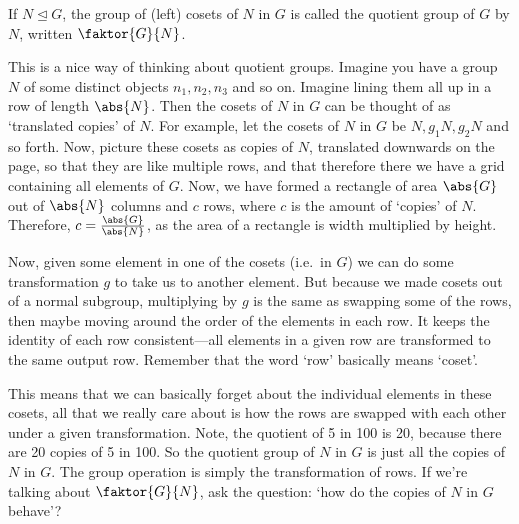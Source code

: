 \begin{definition}
	If \(N \trianglelefteq G\), the group of (left) cosets of \(N\) in \(G\) is called the quotient group of \(G\) by \(N\), written \(\faktor{G}{N}\).
\end{definition}

This is a nice way of thinking about quotient groups.
Imagine you have a group \(N\) of some distinct objects \(n_1, n_2, n_3\) and so on.
Imagine lining them all up in a row of length \(\abs{N}\).
Then the cosets of \(N\) in \(G\) can be thought of as `translated copies' of \(N\).
For example, let the cosets of \(N\) in \(G\) be \(N, g_1N, g_2N\) and so forth.
Now, picture these cosets as copies of \(N\), translated downwards on the page, so that they are like multiple rows, and that therefore there we have a grid containing all elements of \(G\).
Now, we have formed a rectangle of area \(\abs{G}\) out of \(\abs{N}\) columns and \(c\) rows, where \(c\) is the amount of `copies' of \(N\).
Therefore, \(c = \frac{\abs{G}}{\abs{N}}\), as the area of a rectangle is width multiplied by height.

Now, given some element in one of the cosets (i.e.\ in \(G\)) we can do some transformation \(g\) to take us to another element.
But because we made cosets out of a normal subgroup, multiplying by \(g\) is the same as swapping some of the rows, then maybe moving around the order of the elements in each row.
It keeps the identity of each row consistent---all elements in a given row are transformed to the same output row.
Remember that the word `row' basically means `coset'.

This means that we can basically forget about the individual elements in these cosets, all that we really care about is how the rows are swapped with each other under a given transformation.
Note, the quotient of 5 in 100 is 20, because there are 20 copies of 5 in 100.
So the quotient group of \(N\) in \(G\) is just all the copies of \(N\) in \(G\).
The group operation is simply the transformation of rows.
If we're talking about \(\faktor{G}{N}\), ask the question: `how do the copies of \(N\) in \(G\) behave'?

